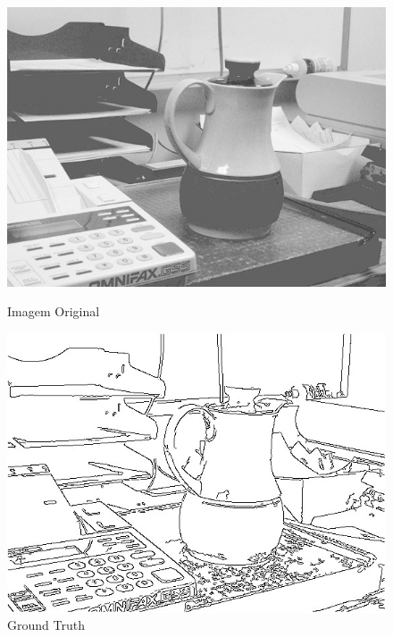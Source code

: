 \documentclass[10pt,twocolumn,letterpaper]{article}
\begin{document}
\begin{figure}[!htb]
  \includegraphics[width=\linewidth]{46.jpg}
  \caption{Imagem Original}\label{fig:orig}
\endminipage\hfill
{}
  \includegraphics[width=\linewidth]{46gt.jpg}
  \caption{Ground Truth}\label{fig:gt}
\endminipage
\end{figure}
\end{document}
